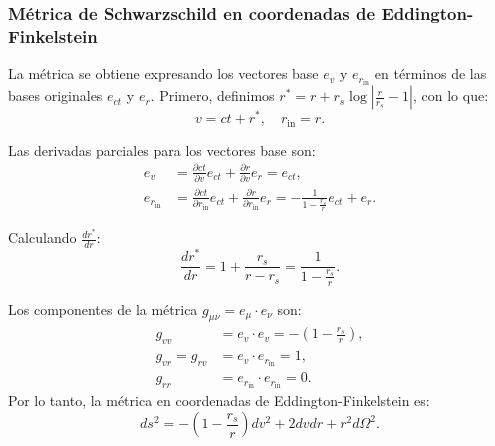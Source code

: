 \subsubsection{Métrica de Schwarzschild en coordenadas de Eddington-Finkelstein}
La métrica se obtiene expresando los vectores base \( e_v \) y \( e_{r_{\text{in}}} \) en términos de las bases originales \( e_{ct} \) y \( e_r \). Primero, definimos \( r^* = r + r_s \log \left| \frac{r}{r_s} - 1 \right| \), con lo que:
\begin{equation}
    v = ct + r^*, \quad r_{\text{in}} = r.
\end{equation}

Las derivadas parciales para los vectores base son:
\begin{equation}
    \begin{aligned}
        e_v               & = \frac{\partial ct}{\partial v} e_{ct} + \frac{\partial r}{\partial v} e_r = e_{ct},                                                            \\
        e_{r_{\text{in}}} & = \frac{\partial ct}{\partial r_{\text{in}}} e_{ct} + \frac{\partial r}{\partial r_{\text{in}}} e_r = -\frac{1}{1 - \frac{r_s}{r}} e_{ct} + e_r.
    \end{aligned}
\end{equation}

Calculando \( \frac{dr^*}{dr} \):
\begin{equation}
    \frac{dr^*}{dr} = 1 + \frac{r_s}{r - r_s} = \frac{1}{1 - \frac{r_s}{r}}.
\end{equation}

Los componentes de la métrica \( g_{\mu\nu} = e_\mu \cdot e_\nu \) son:
\begin{equation}
    \begin{aligned}
        g_{vv}          & = e_v \cdot e_v = -\left(1 - \frac{r_s}{r}\right), \\
        g_{vr} = g_{rv} & = e_v \cdot e_{r_{\text{in}}} = 1,                 \\
        g_{rr}          & = e_{r_{\text{in}}} \cdot e_{r_{\text{in}}} = 0.
    \end{aligned}
\end{equation}
Por lo tanto, la métrica en coordenadas de Eddington-Finkelstein es:
\begin{equation}
    ds^2 = -\left(1 - \frac{r_s}{r}\right) dv^2 + 2 dv dr + r^2 d\Omega^2.
\end{equation}
